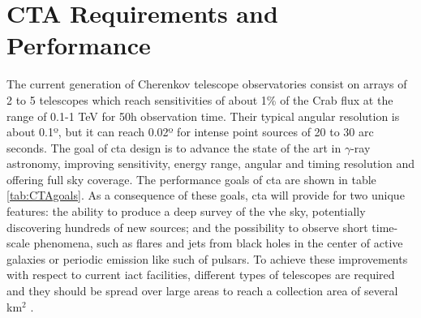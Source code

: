 \documentclass[main.tex]{subfiles}
\begin{document}
\section{CTA Requirements and Performance} \label{sec:ctaperformance}

The current generation of Cherenkov telescope observatories consist on arrays of 2 to 5 telescopes which reach sensitivities of about 1\% of the Crab flux at the range of 0.1-1 TeV for 50h observation time. Their typical angular resolution is about 0.1º, but it can reach 0.02º for intense point sources of 20 to 30 arc seconds. The goal of \gls{cta} design is to advance the state of the art in $\gamma$-ray astronomy, improving sensitivity, energy range, angular and timing resolution and offering full sky coverage. The performance goals of \gls{cta} are shown in table \ref{tab:CTAgoals}. As a consequence of these goals, \gls{cta} will provide for two unique features: the ability to produce a deep survey of the \gls{vhe} sky, potentially discovering hundreds of new sources; and the possibility to observe short time-scale phenomena, such as flares and jets from black holes in the center of active galaxies or periodic emission like such of pulsars. 
To achieve these improvements with respect to current \gls{iact} facilities, different types of telescopes are required and they should be spread over large areas to reach a collection area of several km$^2$ \cite{CTAconcept}.
\end{document}
